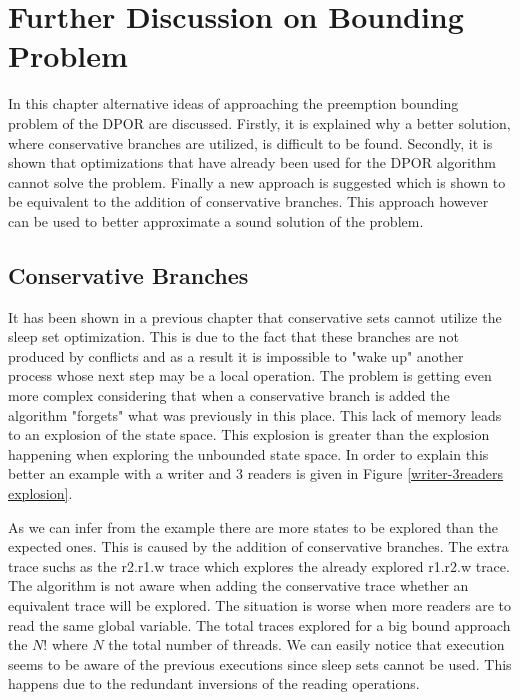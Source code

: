 \chapter{Further Discussion on Bounding Problem}
\label{Chapter 5}

In this chapter alternative ideas of approaching the preemption bounding problem of the DPOR are discussed. Firstly, it is explained why a better solution,
where conservative branches are utilized, is difficult to be found. Secondly, it is shown that optimizations that have already been used for the DPOR algorithm cannot solve the problem.
Finally a new approach is suggested which is shown to be equivalent to the addition of conservative branches. This approach however can be used to better approximate
a sound solution of the problem. 

\section{Conservative Branches}
It has been shown in a previous chapter that conservative sets cannot utilize the sleep set optimization. This is due to the fact that these branches are not produced by conflicts
and as a result it is impossible to "wake up" another process whose next step may be a local operation. The problem is getting even more complex considering that when a conservative branch
is added the algorithm "forgets" what was previously in this place. This lack of memory leads to an explosion of the state space. This explosion is greater than
the explosion happening when exploring the unbounded state space. 
In order to explain this better an example with a writer and 3 readers is given in Figure \ref{writer-3readers explosion}.


As we can infer from the example there are more states to be explored than the expected ones. This is caused by the addition of conservative branches. 
The extra trace suchs as the r2.r1.w trace which explores the already explored r1.r2.w trace. The algorithm is not aware when adding the 
conservative trace whether an equivalent trace will be explored. The situation is worse when more readers are to read the same global variable.
The total traces explored for a big bound approach the $N!$ where $N$ the total number of threads. We can easily notice that execution seems to be aware of the previous executions since sleep sets cannot
be used. This happens due to the redundant inversions of the reading operations. 

